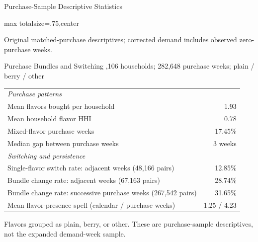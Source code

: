 \documentclass[aspectratio=169,professionalfonts]{beamer}
\newcommand{\shortbuttons}{}
\begin{document}
\gdef\shortbuttons{}
\begin{frame}[label=short-23]{Purchase-Sample Descriptive Statistics}
  \centering
  \begin{adjustbox}{max totalsize={\textwidth}{.75\textheight},center}
    \begin{minipage}{\textwidth}
      
    \end{minipage}
  \end{adjustbox}
  \par\smallskip\raggedright\scriptsize Original matched-purchase descriptives; corrected demand includes observed zero-purchase weeks.
\end{frame}

\gdef\shortbuttons{}
\begin{frame}[label=short-24]{Purchase Bundles and Switching}
  \hypertarget{short-bundle-stats}{}
  \footnotesize
  ,106 households; 282,648 purchase weeks; plain / berry / other
  \par\smallskip
  \begin{tabular}{lr}
    \toprule
    \multicolumn{2}{l}{\textit{Purchase patterns}} \\
    Mean flavors bought per household & 1.93 \\
    Mean household flavor HHI & 0.78 \\
    Mixed-flavor purchase weeks & 17.45\% \\
    Median gap between purchase weeks & 3 weeks \\
    \midrule
    \multicolumn{2}{l}{\textit{Switching and persistence}} \\
    Single-flavor switch rate: adjacent weeks (48,166 pairs) & 12.85\% \\
    Bundle change rate: adjacent weeks (67,163 pairs) & 28.74\% \\
    Bundle change rate: successive purchase weeks (267,542 pairs) & 31.65\% \\
    Mean flavor-presence spell (calendar / purchase weeks) & 1.25 / 4.23 \\
    \bottomrule
  \end{tabular}
  \par\smallskip
  \begin{minipage}{.96\textwidth}
    \scriptsize
    Flavors grouped as plain, berry, or other. These are purchase-sample descriptives, not the expanded demand-week sample.
  \end{minipage}
\end{frame}
\end{document}
